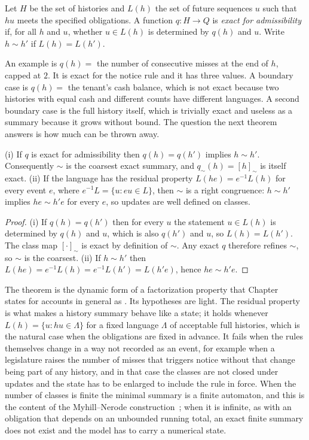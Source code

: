 \begin{definition}\label{def:exact}
Let $H$ be the set of histories and $L(h)$ the set of future sequences $u$ such that $hu$ meets the specified obligations. A function $q:H\to Q$ is \emph{exact for admissibility} if, for all $h$ and $u$, whether $u\in L(h)$ is determined by $q(h)$ and $u$. Write $h\sim h'$ if $L(h)=L(h')$.
\end{definition}

An example is $q(h)=$ the number of consecutive misses at the end of $h$, capped at $2$. It is exact for the notice rule and it has three values. A boundary case is $q(h)=$ the tenant's cash balance, which is not exact because two histories with equal cash and different counts have different languages. A second boundary case is the full history itself, which is trivially exact and useless as a summary because it grows without bound. The question the next theorem answers is how much can be thrown away.

\begin{theorem}\label{thm:P01}
(i) If $q$ is exact for admissibility then $q(h)=q(h')$ implies $h\sim h'$. Consequently $\sim$ is the coarsest exact summary, and $q_\sim(h)=[h]_\sim$ is itself exact. (ii) If the language has the residual property $L(he)=e^{-1}L(h)$ for every event $e$, where $e^{-1}L=\{u:eu\in L\}$, then $\sim$ is a right congruence: $h\sim h'$ implies $he\sim h'e$ for every $e$, so updates are well defined on classes.
\end{theorem}

\begin{proof}
(i) If $q(h)=q(h')$ then for every $u$ the statement $u\in L(h)$ is determined by $q(h)$ and $u$, which is also $q(h')$ and $u$, so $L(h)=L(h')$. The class map $[\cdot]_\sim$ is exact by definition of $\sim$. Any exact $q$ therefore refines $\sim$, so $\sim$ is the coarsest. (ii) If $h\sim h'$ then $L(he)=e^{-1}L(h)=e^{-1}L(h')=L(h'e)$, hence $he\sim h'e$.
\end{proof}

The theorem is the dynamic form of a factorization property that Chapter~ states for accounts in general as . Its hypotheses are light. The residual property is what makes a history summary behave like a state; it holds whenever $L(h)=\{u: hu\in\Lambda\}$ for a fixed language $\Lambda$ of acceptable full histories, which is the natural case when the obligations are fixed in advance. It fails when the rules themselves change in a way not recorded as an event, for example when a legislature raises the number of misses that triggers notice without that change being part of any history, and in that case the classes are not closed under updates and the state has to be enlarged to include the rule in force. When the number of classes is finite the minimal summary is a finite automaton, and this is the content of the Myhill--Nerode construction~\cite{nerode1958}; when it is infinite, as with an obligation that depends on an unbounded running total, an exact finite summary does not exist and the model has to carry a numerical state.

